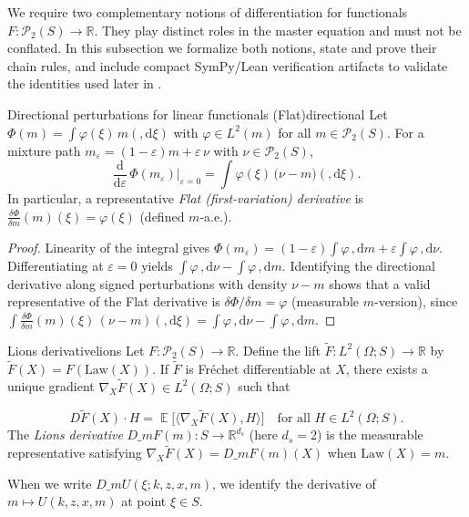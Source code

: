 \documentclass[11pt,letterpaper,oneside]{article}
\numberwithin{equation}{section}
\DeclareMathOperator{\E}{\mathbb{E}}
\newcommand{\R}{\mathbb{R}}
\newcommand{\1}{\mathbf{1}}
\newcommand{\diff}{,\mathrm{d}}
\newcommand{\dmU}{D\_m U}
\newcommand{\Dm}{D\_m}
\newcommand{\ip}[2]{\langle #1,#2\rangle}
\begin{document}
We require two complementary notions of differentiation for functionals $F:\mathcal P_2(S)\to\R$. They play distinct roles in the master equation and must not be conflated. In this subsection we formalize both notions, state and prove their chain rules, and include compact SymPy/Lean verification artifacts to validate the identities used later in .

\begin{lemma}{Directional perturbations for linear functionals (Flat)}{directional}
Let $\Phi(m)=\int \varphi(\xi)\,m(\diff \xi)$ with $\varphi\in L^2(m)$ for all $m\in\mathcal P_2(S)$. For a mixture path $m_\varepsilon=(1-\varepsilon)m+\varepsilon\,\nu$ with $\nu\in\mathcal P_2(S)$,
\[
\frac{\mathrm d}{\mathrm d\varepsilon}\,\Phi(m_\varepsilon)\Big|_{\varepsilon=0}
= \int \varphi(\xi)\,\big(\nu-m\big)(\diff\xi).
\]
In particular, a representative \emph{Flat (first-variation) derivative} is $\tfrac{\delta \Phi}{\delta m}(m)(\xi)=\varphi(\xi)$ (defined $m$-a.e.).
\end{lemma}

\begin{proof}
Linearity of the integral gives $\Phi(m_\varepsilon)=(1-\varepsilon)\int\varphi\,\diff m+\varepsilon\int\varphi\,\diff\nu$. Differentiating at $\varepsilon=0$ yields $\int\varphi\,\diff\nu-\int\varphi\,\diff m$. Identifying the directional derivative along signed perturbations with density $\nu-m$ shows that a valid representative of the Flat derivative is $\delta\Phi/\delta m=\varphi$ (measurable $m$-version), since $\int \tfrac{\delta\Phi}{\delta m}(m)(\xi)\, (\nu-m)(\diff\xi)=\int\varphi\,\diff\nu-\int\varphi\,\diff m$.
\end{proof}

\begin{definition}{Lions derivative}{lions}
Let $F:\mathcal P_2(S)\to\R$. Define the lift $\tilde F: L^2(\Omega;S)\to\R$ by $\tilde F(X)=F(\mathrm{Law}(X))$. If $\tilde F$ is Fr\'echet differentiable at $X$, there exists a unique gradient $\nabla_X\tilde F(X)\in L^2(\Omega;S)$ such that

$$
D\tilde F(X)\cdot H = \E\big[\ip{ \nabla_X\tilde F(X)}{H}\big]\quad\text{for all }H\in L^2(\Omega;S).
$$
The \emph{Lions derivative} $\Dm F(m):S\to\R^{d_s}$ (here $d_s=2$) is the measurable representative satisfying $\nabla_X\tilde F(X)=\Dm F(m)(X)$ when $\mathrm{Law}(X)=m$.

When we write $\dmU(\xi;k,z,x,m)$, we identify the derivative of $m\mapsto U(k,z,x,m)$ at point $\xi\in S$.
\end{definition}
\end{document}
